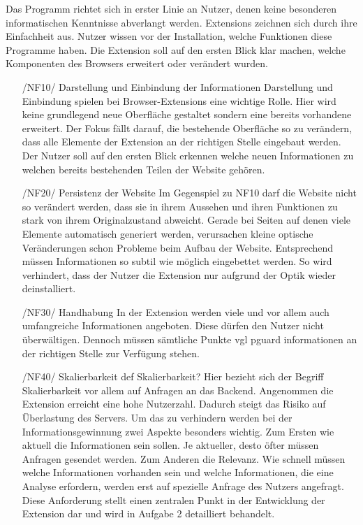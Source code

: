 Das Programm richtet sich in erster Linie an Nutzer, denen keine besonderen informatischen Kenntnisse abverlangt werden.
Extensions zeichnen sich durch ihre Einfachheit aus. Nutzer wissen vor der Installation, welche Funktionen diese Programme haben. Die Extension soll auf den ersten Blick klar machen, welche Komponenten des Browsers erweitert oder verändert wurden.
\begin{itemize}
	\item[/NF10/] Darstellung und Einbindung der Informationen
	Darstellung und Einbindung spielen bei Browser-Extensions eine wichtige Rolle. Hier wird keine grundlegend neue Oberfläche gestaltet sondern eine bereits vorhandene erweitert. Der Fokus fällt darauf, die bestehende Oberfläche so zu verändern, dass alle Elemente der Extension an der richtigen Stelle eingebaut werden. Der Nutzer soll auf den ersten Blick erkennen welche neuen Informationen zu welchen bereits bestehenden Teilen der Website gehören.
	\item[/NF20/] Persistenz der Website
	Im Gegenspiel zu NF10 darf die Website nicht so verändert werden, dass sie in ihrem Aussehen und ihren Funktionen zu stark von ihrem Originalzustand abweicht. Gerade bei Seiten auf denen viele Elemente automatisch generiert werden, verursachen kleine optische Veränderungen schon Probleme beim Aufbau der Website. Entsprechend müssen Informationen so subtil wie möglich eingebettet werden. So wird verhindert, dass der Nutzer die Extension nur aufgrund der Optik wieder deinstalliert.
	\item[/NF30/] Handhabung
	In der Extension werden viele und vor allem auch umfangreiche Informationen angeboten. Diese dürfen den Nutzer nicht überwältigen. Dennoch müssen sämtliche Punkte vgl pguard informationen an der richtigen Stelle zur Verfügung stehen.
	\item[/NF40/] Skalierbarkeit
	def Skalierbarkeit? Hier bezieht sich der Begriff Skalierbarkeit vor allem auf Anfragen an das Backend. Angenommen die Extension erreicht eine hohe Nutzerzahl. Dadurch steigt das Risiko auf Überlastung des Servers. Um das zu verhindern werden bei der Informationsgewinnung zwei Aspekte besonders wichtig. Zum Ersten wie aktuell die Informationen sein sollen. Je aktueller, desto öfter müssen Anfragen gesendet werden. Zum Anderen die Relevanz. Wie schnell müssen welche Informationen vorhanden sein und welche Informationen, die eine Analyse erfordern, werden erst auf spezielle Anfrage des Nutzers angefragt. Diese Anforderung stellt einen zentralen Punkt in der Entwicklung der Extension dar und wird in Aufgabe 2 detailliert behandelt.

\end{itemize}
